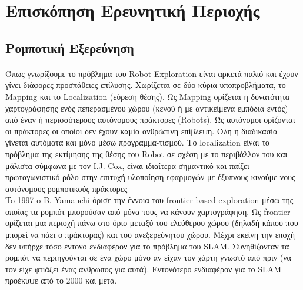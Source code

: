 \section{Επισκόπηση Ερευνητική Περιοχής}

\subsection{Ρομποτική Εξερεύνηση}

	\paragraph{}Όπως γνωρίζουμε το πρόβλημα του Robot Exploration είναι
	 αρκετά παλιό και έχουν γίνει διάφορες προσπάθειες επίλυσης. 
	Χωρίζεται σε δύο κύρια υποπροβλήματα, το Mapping και το Localization (εύρεση θέσης). Ως Mapping ορίζεται η δυνατότητα χαρτογράφησης
	ενός πεπερασμένου χώρου (κενού ή με αντικείμενα εμπόδια εντός) από έναν ή περισσότερους αυτόνομους 
	πράκτορες (Robots). Ώς αυτόνομοι ορίζονται οι πράκτορες οι οποίοι δεν έχουν καμία ανθρώπινη επίβλεψη. 
	Όλη η διαδικασία γίνεται αυτόματα και μόνο μέσω προγραμμα-τισμού.  Το localization είναι το πρόβλημα της εκτίμησης 
	της θέσης του Robot σε σχέση με το περιβάλλον του και μάλιστα σύμφωνα με τον I.J. Cox\cite{Cox1991}, είναι ιδιαίτερα σημαντικό 
	και παίζει πρωταγωνιστικό ρόλο στην επιτυχή υλοποίηση εφαρμογών με έξυπνους κινούμε-νους αυτόνομους ρομποτικούς πράκτορες \\
	
	To 1997 o B. Yamauchi \cite{Yamauchi} όρισε την έννοια του frontier-based exploration μέσω της οποίας τα ρομπότ μπορούσαν από μόνα τους να κάνουν χαρτογράφηση. 
	Ως frontier ορίζεται μια περιοχή πάνω στο όριο μεταξύ του ελεύθερου χώρου (δηλαδή κάπου που μπορεί να πάει ο πράκτορας) και του ανεξερεύνητου χώρου. Μέχρι εκείνη την εποχή δεν υπήρχε τόσο έντονο ενδιαφέρον για το πρόβλημα του SLAM. Συνηθίζονταν τα ρομπότ να περιηγούνται σε ένα χώρο μόνο αν είχαν τον χάρτη γνωστό από πριν (να τον είχε φτιάξει ένας άνθρωπος για αυτά). Εντονότερο ενδιαφέρον για το SLAM προέκυψε από το 2000 και μετά. \\
	
	
	
